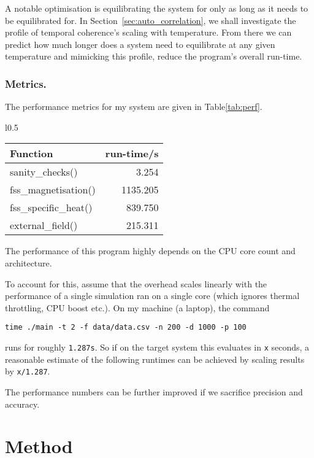 \documentclass[12pt]{article}
\begin{document}
A notable optimisation is equilibrating the system for only as long as it needs to be equilibrated for. In Section~\ref{sec:auto_correlation}, we shall investigate the profile of temporal coherence's scaling with temperature. From there we can predict how much longer does a system need to equilibrate at any given temperature and mimicking this profile, reduce the program's overall run-time. 

\subsubsection{Metrics.}

The performance metrics for my system are given in Table\ref{tab:perf}.

\begin{wraptable}{l}{0.5\textwidth}
  \caption{Performance metric for the Ising model simulation, runtime of each section of investigations of the functions (measured externally)}\label{tab:perf}
  \begin{tabular}{l|r}
    Function & run-time/s \\
    \hline
    sanity\_checks() & 3.254\\
    fss\_magnetisation() & 1135.205\\
    fss\_specific\_heat() & 839.750\\
    external\_field() & 215.311
  \end{tabular}
\end{wraptable}

The performance of this program highly depends on the CPU core count and architecture.

To account for this, assume that the overhead scales linearly with the performance of a single simulation ran on a single core (which ignores thermal throttling, CPU boost etc.). On my machine (a laptop), the command

\texttt{time ./main -t 2 -f data/data.csv -n 200 -d 1000 -p 100}

runs for roughly \texttt{1.287s}. So if on the target system this evaluates in \texttt{x} seconds, a reasonable estimate of the following runtimes can be achieved by scaling results by \texttt{x/1.287}.

The performance numbers can be further improved if we sacrifice precision and accuracy. 


 
\section{Method}\label{sec:simulation_data}
\end{document}
